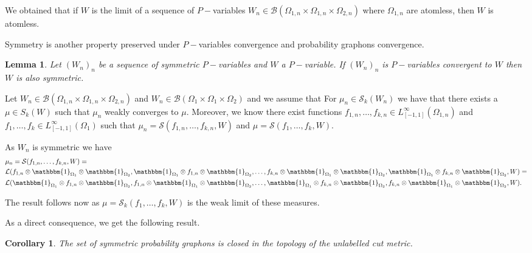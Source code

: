 \documentclass[11pt]{article}
\newtheorem{corollary}{Corollary}[theorem]
\newtheorem{lemma}[theorem]{Lemma}
\newcommand{\cB}{{\mathcal B}}  %
\newcommand{\cS}{{\mathcal S}}  %
\begin{document}
We obtained that if $W$ is the limit of a sequence of $P-$variables $W_n\in \cB(\Omega_{1,n}\times\Omega_{1,n} \times \Omega_{2,n} )$ where $\Omega_{1,n}$ are atomless, then $W$ is atomless.
\endproof

Symmetry is another property preserved under $P-$variables convergence and probability graphons convergence.

\begin{lemma}
Let $(W_n)_n$ be a sequence of symmetric $P-$variables and $W$ a $P-$variable. If  $(W_n)_n$ is $P-$variables convergent to $W$ then $W$ is also symmetric.
\end{lemma}
\proof
Let $W_n\in \cB(\Omega_{1,n}\times \Omega_{1,n}\times \Omega_{2,n})$ and $W_n\in \cB(\Omega_{1}\times \Omega_{1}\times \Omega_{2})$ and we assume that 
For $\mu_n\in \cS_k(W_n)$ we have that there exists a $\mu\in S_k(W)$ such that $\mu_n$ weakly converges to $\mu.$
Moreover, we know there exist functions $f_{1,n},\ldots, f_{k,n}\in L^{\infty }_{[-1,1]}(\Omega_{1,n})$ and $f_{1},\ldots, f_{k}\in L^{\infty }_{[-1,1]}(\Omega_{1})$ such that $\mu_n=\cS(f_{1,n},\ldots, f_{k,n},W)$ and $\mu=\cS(f_{1},\ldots, f_{k},W).$

As $W_n$ is symmetric we have
$$
\begin{aligned}&\mu_n=\cS(f_{1,n},\ldots, f_{k,n},W)=\\
&\mathcal{L}(f_{1,n} \otimes\mathbbm{1}_{\Omega_1} \otimes \mathbbm{1}_{\Omega_2},\mathbbm{1}_{\Omega_1}\otimes f_{1,n} \otimes\mathbbm{1}_{\Omega_2},\ldots, f_{k,n} \otimes\mathbbm{1}_{\Omega_1} \otimes \mathbbm{1}_{\Omega_2},\mathbbm{1}_{\Omega_1}\otimes f_{k,n} \otimes\mathbbm{1}_{\Omega_2},W)=\\
&\mathcal{L}(\mathbbm{1}_{\Omega_1}\otimes f_{1,n} \otimes\mathbbm{1}_{\Omega_2},f_{1,n} \otimes\mathbbm{1}_{\Omega_1} \otimes \mathbbm{1}_{\Omega_2},\ldots, \mathbbm{1}_{\Omega_1}\otimes f_{k,n} \otimes\mathbbm{1}_{\Omega_2},f_{k,n} \otimes\mathbbm{1}_{\Omega_1} \otimes \mathbbm{1}_{\Omega_2},W).
\end{aligned}$$

The result follows now as $\mu=\cS_k(f_{1},\ldots, f_{k},W)$ is the weak limit of these measures.
\endproof

As a direct consequence, we get the following result.

\begin{corollary}
The set of symmetric probability graphons is closed in the topology of the unlabelled cut metric.  
\end{corollary}
\end{document}
